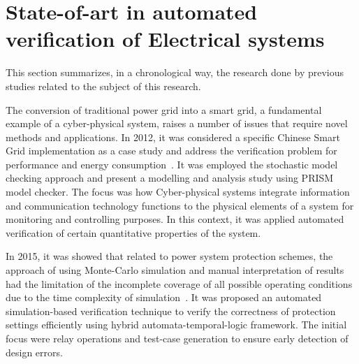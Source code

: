 \documentclass[runningheads]{llncs}
\begin{document}
\section{State-of-art in automated verification of Electrical systems}

This section summarizes, in a chronological way, the research done by previous studies related to the subject of this research.

The conversion of traditional power grid into a smart grid, a fundamental example of a cyber-physical system, raises a number of issues that require novel methods and applications. In 2012, it was considered a specific Chinese Smart Grid implementation as a case study and address the verification problem for performance and energy consumption~\cite{Yukseletall2012}. It was employed the stochastic model checking approach and present a modelling and analysis study using PRISM model checker. The focus was how Cyber-physical systems integrate information and communication technology functions to the physical elements of a system for monitoring and controlling purposes.  In this context, it was applied automated verification of certain quantitative properties of the system. %

%
In 2015, it was showed that related to power system protection schemes, the approach of using Monte-Carlo simulation and manual interpretation of results had the limitation of the incomplete coverage of all possible operating conditions due to the time complexity of simulation~\cite{Sengupta2015}. It was proposed an automated simulation-based verification technique to verify the correctness of protection settings efficiently using hybrid automata-temporal-logic framework. The initial focus were relay operations and test-case generation to ensure early detection of design errors. %
\end{document}

